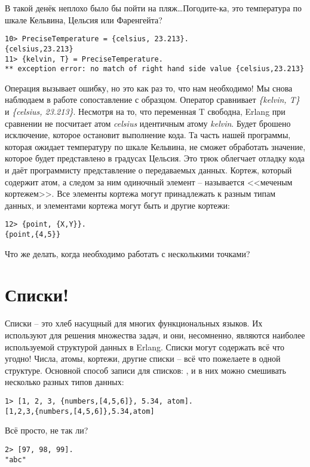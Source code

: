 В такой денёк неплохо было бы пойти на пляж\ldots Погодите\--ка, это температура по шкале Кельвина, Цельсия или Фаренгейта?
\begin{lstlisting}[style=repl]
10> PreciseTemperature = {celsius, 23.213}.
{celsius,23.213}
11> {kelvin, T} = PreciseTemperature.
** exception error: no match of right hand side value {celsius,23.213}
\end{lstlisting}

Операция вызывает ошибку, но это как раз то, что нам необходимо! Мы снова наблюдаем в работе сопоставление с образцом.
Оператор \ops{=} сравнивает \emph{\{kelvin, T\}} и \emph{\{celsius, 23.213\}}.
Несмотря на то, что переменная T свободна, Erlang при сравнении не посчитает атом \emph{celsius} идентичным атому \emph{kelvin}.
Будет брошено исключение, которое остановит выполнение кода.
Та часть нашей программы, которая ожидает температуру по шкале Кельвина, не сможет обработать значение, которое будет представлено в градусах Цельсия.
Это трюк облегчает отладку кода и даёт программисту представление о передаваемых данных.
Кортеж, который содержит атом, а следом за ним одиночный элемент \--- называется <<меченым кортежем>>.
Все элементы кортежа могут принадлежать к разным типам данных, и элементами кортежа могут быть и другие кортежи: \begin{lstlisting}[style=repl]
12> {point, {X,Y}}.
{point,{4,5}}
\end{lstlisting}

Что же делать, когда необходимо работать с несколькими точками?
\section{Списки!}
\label{lists}
Списки \--- это хлеб насущный для многих функциональных языков.
Их используют для решения множества задач, и они, несомненно, являются наиболее используемой структурой данных в Erlang.
Списки могут содержать всё что угодно!
Числа, атомы, кортежи, другие списки \--- всё что пожелаете в одной структуре.
Основной способ записи для списков: , и в них можно смешивать несколько разных типов данных:
\begin{lstlisting}[style=repl]
1> [1, 2, 3, {numbers,[4,5,6]}, 5.34, atom].
[1,2,3,{numbers,[4,5,6]},5.34,atom]
\end{lstlisting}

Всё просто, не так ли?
\begin{lstlisting}[style=repl]
2> [97, 98, 99].
"abc"
\end{lstlisting}

